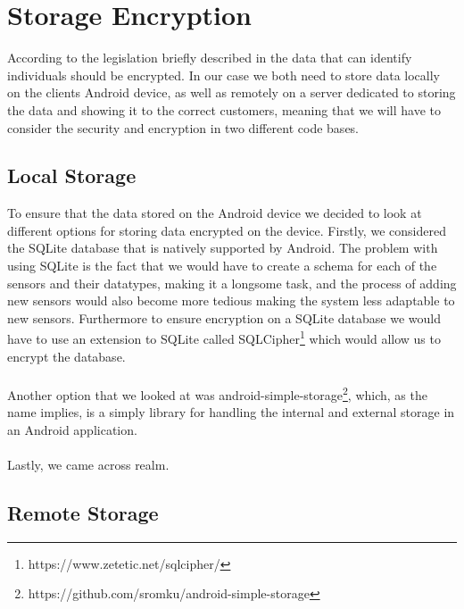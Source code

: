 
\section{Storage Encryption}
\label{sec:storage_encryption}
According to the legislation briefly described in  the data that can identify individuals should be encrypted. In our case we both need to store data locally on the clients Android device, as well as remotely on a server dedicated to storing the data and showing it to the correct customers, meaning that we will have to consider the security and encryption in two different code bases. 

\subsection{Local Storage}
\label{sub:local_storage}
To ensure that the data stored on the Android device we decided to look at different options for storing data encrypted on the device. Firstly, we considered the SQLite database that is natively supported by Android. The problem with using SQLite is the fact that we would have to create a schema for each of the sensors and their datatypes, making it a longsome task, and the process of adding new sensors would also become more tedious making the system less adaptable to new sensors. Furthermore to ensure encryption on a SQLite database we would have to use an extension to SQLite called SQLCipher\footnote{https://www.zetetic.net/sqlcipher/} which would allow us to encrypt the database. 
\\\\
Another option that we looked at was android-simple-storage\footnote{https://github.com/sromku/android-simple-storage}, which, as the name implies, is a simply library for handling the internal and external storage in an Android application. 
\\\\
Lastly, we came across realm. 



\subsection{Remote Storage}
\label{sub:remote_storage}


